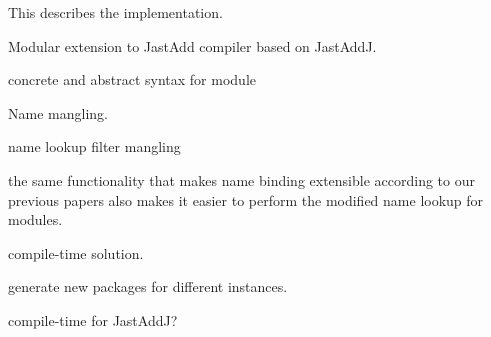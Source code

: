 This describes the implementation.

Modular extension to JastAdd compiler based on JastAddJ.

concrete and abstract syntax for module 

Name mangling.

name lookup
  filter
  mangling

the same functionality that makes name binding extensible according to our
previous papers also makes it easier to perform the modified name lookup
for modules.

compile-time solution. 

generate new packages for different instances.

compile-time for JastAddJ?





